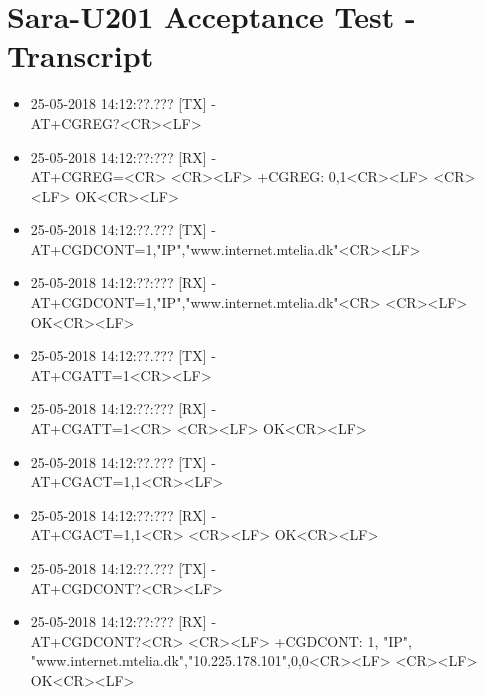 \chapter{Sara-U201 Acceptance Test - Transcript}
\label{app:GSMcomm}
\begin{itemize}
	\item 25-05-2018 14:12:??.??? [TX] -\\ AT+CGREG?<CR><LF>
	\item 25-05-2018 14:12:??:??? [RX] -\\
	AT+CGREG=<CR> \newline <CR><LF> \newline +CGREG: 0,1<CR><LF> \newline <CR><LF> \newline OK<CR><LF>
	\item 25-05-2018 14:12:??.??? [TX] -\\
	AT+CGDCONT=1,"IP","www.internet.mtelia.dk"<CR><LF>
	\item 25-05-2018 14:12:??:??? [RX] -\\
	AT+CGDCONT=1,"IP","www.internet.mtelia.dk"<CR> \newline <CR><LF> \newline OK<CR><LF>
	\item 25-05-2018 14:12:??.??? [TX] -\\
	AT+CGATT=1<CR><LF>
	\item 25-05-2018 14:12:??:??? [RX] -\\
	AT+CGATT=1<CR> \newline <CR><LF> \newline OK<CR><LF>
	\item 25-05-2018 14:12:??.??? [TX] -\\
	AT+CGACT=1,1<CR><LF>
	\item 25-05-2018 14:12:??:??? [RX] -\\
	AT+CGACT=1,1<CR> \newline <CR><LF> \newline OK<CR><LF>
	\item 25-05-2018 14:12:??.??? [TX] -\\
	AT+CGDCONT?<CR><LF>
	\item 25-05-2018 14:12:??:??? [RX] -\\
	AT+CGDCONT?<CR> \newline <CR><LF> \newline +CGDCONT: 1, "IP", "www.internet.mtelia.dk","10.225.178.101",0,0<CR><LF> \newline <CR><LF> \newline OK<CR><LF>

\end{itemize}
